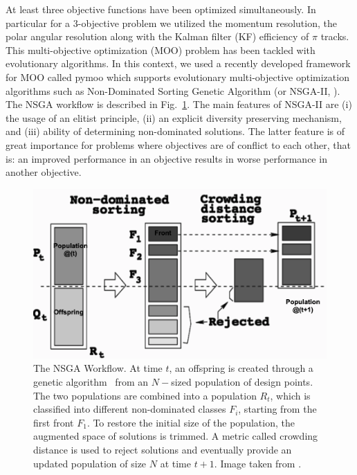 At least three objective functions have been optimized simultaneously. In particular for a 3-objective problem we utilized the momentum resolution, the polar angular resolution along with the Kalman filter (KF) efficiency of $\pi$ tracks. 
This multi-objective optimization (MOO) problem has been tackled with evolutionary algorithms. 
In this context, we used a recently developed framework for MOO called pymoo \cite{blank2020pymoo} which supports evolutionary multi-objective optimization algorithms such as Non-Dominated Sorting Genetic Algorithm (or NSGA-II, \cite{deb2002fast}). 
The NSGA workflow is described in Fig.~\ref{fig:NSGA_workflow}.
The main features of NSGA-II are (i) the usage of an elitist principle, (ii) an explicit diversity preserving mechanism, and (iii) ability of determining non-dominated solutions. 
%
The latter feature is of great importance for problems where objectives are of conflict to each other, that is: an improved performance in an objective results in worse performance in another objective.

\begin{figure}[!]
    \centering
    \includegraphics[scale = 0.35]{figs/NSGA_workflow2.png}
    \caption{The NSGA Workflow. At time $t$, an offspring is created through a genetic algorithm~\cite{whitley1994genetic} from an $N-$sized population of design points. 
    The two populations are combined into a population $R_{t}$, which is classified into different non-dominated classes $F_{i}$, starting from the first front $F_{1}$. 
    To restore the initial size of the population, the augmented space of solutions is trimmed. A metric called crowding distance is used to reject solutions and eventually provide an updated population of size $N$ at time $t+1$. 
    Image taken from \cite{deb2002fast}.
    }
    \label{fig:NSGA_workflow}
\end{figure}

